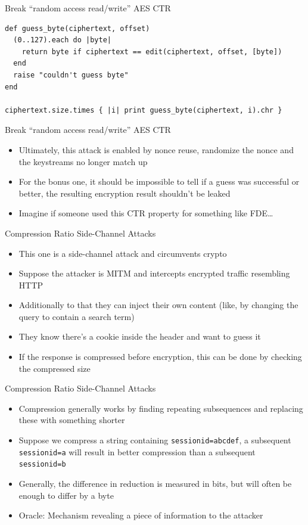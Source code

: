 \documentclass[presentation]{beamer}
\begin{document}
\begin{frame}[fragile,label={sec:org83d14b3}]{Break “random access read/write” AES CTR}
 \begin{verbatim}
def guess_byte(ciphertext, offset)
  (0..127).each do |byte|
    return byte if ciphertext == edit(ciphertext, offset, [byte])
  end
  raise "couldn't guess byte"
end

ciphertext.size.times { |i| print guess_byte(ciphertext, i).chr }
\end{verbatim}
\end{frame}

\begin{frame}[label={sec:org0592f3d}]{Break “random access read/write” AES CTR}
\begin{itemize}
\item Ultimately, this attack is enabled by nonce reuse, randomize the
nonce and the keystreams no longer match up
\item For the bonus one, it should be impossible to tell if a guess was
successful or better, the resulting encryption result shouldn't be
leaked
\item Imagine if someone used this CTR property for something like FDE\ldots{}
\end{itemize}
\end{frame}

\begin{frame}[label={sec:orgeb4f0e1}]{Compression Ratio Side-Channel Attacks}
\begin{itemize}
\item This one is a side-channel attack and circumvents crypto
\item Suppose the attacker is MITM and intercepts encrypted traffic
resembling HTTP
\item Additionally to that they can inject their own content (like, by
changing the query to contain a search term)
\item They know there's a cookie inside the header and want to guess it
\item If the response is compressed before encryption, this can be done by
checking the compressed size
\end{itemize}
\end{frame}

\begin{frame}[fragile,label={sec:org6368165}]{Compression Ratio Side-Channel Attacks}
 \begin{itemize}
\item Compression generally works by finding repeating subsequences and
replacing these with something shorter
\item Suppose we compress a string containing \texttt{sessionid=abcdef}, a
subsequent \texttt{sessionid=a} will result in better compression than a
subsequent \texttt{sessionid=b}
\item Generally, the difference in reduction is measured in bits, but will
often be enough to differ by a byte
\item Oracle: Mechanism revealing a piece of information to the attacker
\end{itemize}
\end{frame}
\end{document}
